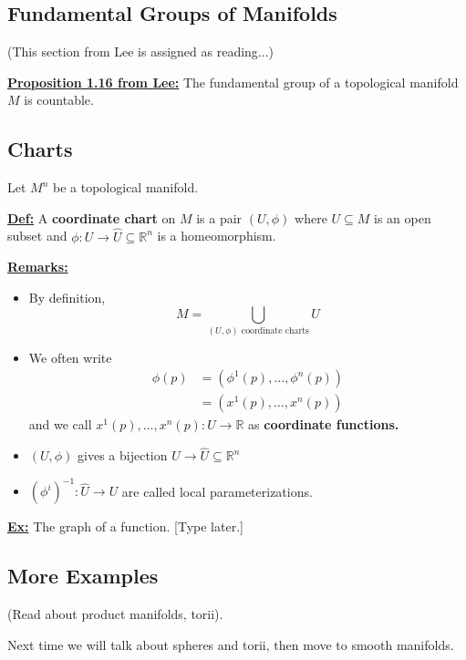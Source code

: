 \documentclass{article}
\begin{document}
\vskip 1cm
\subsection{Fundamental Groups of Manifolds} (This section from Lee is assigned as reading...)

\vskip 0.5cm
\underline{\textbf{Proposition 1.16 from Lee:}} The fundamental group of a topological manifold $M$ is countable.

\vskip 1cm
\subsection{Charts}

\vskip 0.5cm
Let $M^n$ be a topological manifold.
\vskip 0.5cm

\underline{\textbf{Def:}} A \textbf{coordinate chart} on $M$ is a pair $(U, \phi)$ where $U \subseteq M$ is an open subset and $\phi: U \rightarrow \hat{U} \subseteq \mathbb{R}^n$ is a homeomorphism.

\vskip 0.5cm
\underline{\textbf{Remarks:}}
\begin{itemize}
  \item By definition, \[ M = \bigcup_{ (U, \phi) \text{ coordinate charts}} U \]
  
  \item We often write 
  \begin{align*}
    \phi(p) &= \left( \phi^1(p), \dots, \phi^n(p) \right) \\
    &= \left( x^1(p), \dots, x^n(p) \right)
  \end{align*}
  and we call $x^1(p), \dots, x^n(p) : U \rightarrow \mathbb{R}$ as \textbf{coordinate functions.}

  \item $(U, \phi)$ gives a bijection $ U \rightarrow \hat{U} \subseteq \mathbb{R}^n$
  
  \item $(\phi^i)^{-1} : \hat{U} \rightarrow U$ are called local parameterizations.
\end{itemize}

\vskip 0.5cm
\underline{\textbf{Ex:}} The graph of a function. [Type later.]

\vskip 1cm
\subsection{More Examples}

(Read about product manifolds, torii).

Next time we will talk about spheres and torii, then move to smooth manifolds.
\end{document}
